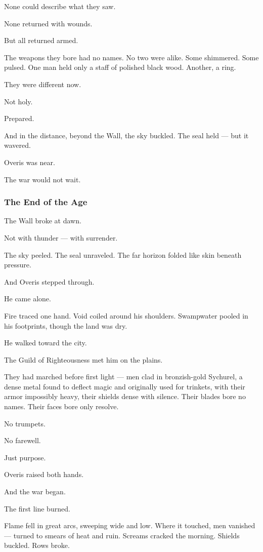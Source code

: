 \documentclass[12pt]{article}
\begin{document}
None could describe what they saw.

None returned with wounds.

But all returned armed.

The weapons they bore had no names. No two were alike. Some shimmered. Some pulsed. One man held only a staff of polished black wood. Another, a ring.

They were different now.

Not holy.

Prepared.

And in the distance, beyond the Wall, the sky buckled. The seal held — but it wavered.

Overis was near.

The war would not wait.


\dotfill

\subsubsection*{The End of the Age}

The Wall broke at dawn.

Not with thunder — with surrender.

The sky peeled. The seal unraveled. The far horizon folded like skin beneath pressure.

And Overis stepped through.

He came alone.

Fire traced one hand. Void coiled around his shoulders. Swampwater pooled in his footprints, though the land was dry.

He walked toward the city.

The Guild of Righteousness met him on the plains.

They had marched before first light — men clad in bronzish-gold Sychurel, a dense metal found to deflect magic and originally used for trinkets, with their armor impossibly heavy, their shields dense with silence. Their blades bore no names. Their faces bore only resolve.

No trumpets.

No farewell.

Just purpose.

Overis raised both hands.

And the war began.

The first line burned.

Flame fell in great arcs, sweeping wide and low. Where it touched, men vanished — turned to smears of heat and ruin. Screams cracked the morning. Shields buckled. Rows broke.
\end{document}
